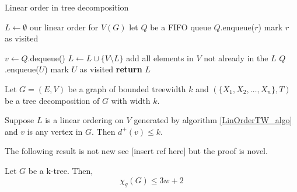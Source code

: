 \begin{algorithm}[h]
    \caption{Linear order in tree decomposition}
    \label{LinOrderTW_algo}
    \begin{algorithmic}[1]
        
            \State $L \gets \emptyset$ \Comment our linear order for $V(G)$
            \State let $Q$ be a FIFO queue 
            \State $Q$.enqueue($r$)
            \State mark $r$ as visited
            
                \State $v \gets Q$.dequeue()
                \State $L \gets L \cup \{V\setminus L\}$ \Comment add all elements in $V$ not already in the $L$
                    \State $Q$.enqueue($U$)
                    \State mark $U$ as visited
                \EndFor        
            \EndWhile 
            \State \textbf{return}  $L$
        \EndFunction
    \end{algorithmic}
\end{algorithm}

\begin{lemma} \label{TWLinOrdBound}
    Let $G=(E,V)$ be a graph of bounded treewidth $k$ and $(\{X_1,X_2,\dots,X_n\},T)$ be a tree decomposition of $G$ with width $k$.
    
    Suppose $L$ is a linear ordering on $V$ generated by algorithm \ref{LinOrderTW_algo} and $v$ is any vertex in $G$. Then $d^+(v) \leq k$. 
\end{lemma}


The following result is not new see [insert ref here] but the proof is novel.
\begin{theorem} \label{ktree}
        Let $G$ be a k-tree. Then, 
        \[\chi_g(G) \leq 3w + 2\]
\end{theorem}

